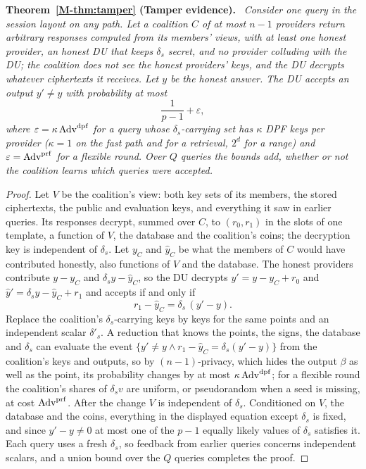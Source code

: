 \documentclass[11pt,a4paper]{article}
\newcommand{\mref}[1]{\ref{M-#1}}
\newenvironment{restated}[1]{\par\medskip\noindent\textbf{#1.}\ \itshape}{\par\medskip}
\begin{document}
\begin{restated}{Theorem~\mref{thm:tamper} (Tamper evidence)}
Consider one query in the session layout on any path. Let a coalition $C$ of at
most $n-1$ providers return arbitrary responses computed from its members'
views, with at least one honest provider, an honest DU that keeps $\delta_s$
secret, and no provider colluding with the DU; the coalition does not see the
honest providers' keys, and the DU decrypts whatever ciphertexts it receives.
Let $y$ be the honest answer. The DU accepts an output $y'\neq y$ with probability at most
\[
\frac{1}{p-1}+\varepsilon,
\]
where $\varepsilon=\kappa\,\mathrm{Adv}^{\mathrm{dpf}}$ for a query whose $\delta_s$-carrying set
has $\kappa$ DPF keys per provider ($\kappa=1$ on the fast path and for a
retrieval, $2^d$ for a range) and $\varepsilon=\mathrm{Adv}^{\mathrm{prf}}$ for a flexible round. Over $Q$ queries the
bounds add, whether or not the coalition learns which queries were accepted.
\end{restated}
\begin{proof}
Let $V$ be the coalition's view: both key sets of its members, the stored
ciphertexts, the public and evaluation keys, and everything it saw in earlier
queries. Its responses decrypt, summed over $C$, to $(r_0,r_1)$ in the slots of
one template, a function of $V$, the database and the coalition's coins; the
decryption key is independent of $\delta_s$. Let $y_C$ and $\hat y_C$ be what
the members of $C$ would have contributed honestly, also functions of $V$ and
the database. The honest providers contribute $y-y_C$ and
$\delta_sy-\hat y_C$, so the DU decrypts $y'=y-y_C+r_0$ and
$\hat y'=\delta_sy-\hat y_C+r_1$ and accepts if and only if
\[
r_1-\hat y_C=\delta_s\,(y'-y).
\]
Replace the coalition's $\delta_s$-carrying keys by keys for the same points
and an independent scalar $\delta'_s$. A reduction that knows the points, the
signs, the database and $\delta_s$ can evaluate the event
$\{y'\neq y\wedge r_1-\hat y_C=\delta_s(y'-y)\}$ from the coalition's keys and
outputs, so by $(n{-}1)$-privacy, which hides the output $\beta$ as well as the
point, its probability changes by at most $\kappa\,\mathrm{Adv}^{\mathrm{dpf}}$; for a flexible
round the coalition's shares of $\delta_sv$ are uniform, or pseudorandom when a
seed is missing, at cost $\mathrm{Adv}^{\mathrm{prf}}$. After the change $V$ is independent of
$\delta_s$. Conditioned on $V$, the database and the coins, everything in the
displayed equation except $\delta_s$ is fixed, and since $y'-y\neq0$ at most one
of the $p-1$ equally likely values of $\delta_s$ satisfies it. Each query uses
a fresh $\delta_s$, so feedback from earlier queries concerns independent
scalars, and a union bound over the $Q$ queries completes the proof. 
\end{proof}
\end{document}

